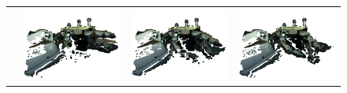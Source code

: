 \begin{figure}
\begin{tabular}{cc:c:c}
 & \includegraphics[width=\imgwidth]{images/eval_vicon/sequence/finger_movement/obs_0.png} & \includegraphics[width=\imgwidth]{images/eval_vicon/sequence/finger_movement/obs_33.png} & \includegraphics[width=\imgwidth]{images/eval_vicon/sequence/finger_movement/obs_61.png} \\


\end{tabular}
\end{figure}
